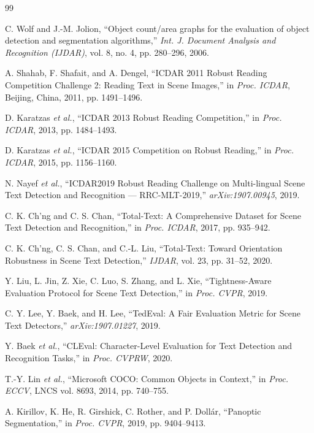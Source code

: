 \documentclass[11pt]{article}
\begin{document}
\begin{thebibliography}{99}

 C. Wolf and J.-M. Jolion, ``Object count/area graphs for the evaluation of object detection and segmentation algorithms,'' \emph{Int. J. Document Analysis and Recognition (IJDAR)}, vol. 8, no. 4, pp. 280--296, 2006.

 A. Shahab, F. Shafait, and A. Dengel, ``ICDAR 2011 Robust Reading Competition Challenge 2: Reading Text in Scene Images,'' in \emph{Proc. ICDAR}, Beijing, China, 2011, pp. 1491--1496.

 D. Karatzas \emph{et al.}, ``ICDAR 2013 Robust Reading Competition,'' in \emph{Proc. ICDAR}, 2013, pp. 1484--1493.

 D. Karatzas \emph{et al.}, ``ICDAR 2015 Competition on Robust Reading,'' in \emph{Proc. ICDAR}, 2015, pp. 1156--1160.

 N. Nayef \emph{et al.}, ``ICDAR2019 Robust Reading Challenge on Multi-lingual Scene Text Detection and Recognition --- RRC-MLT-2019,'' \emph{arXiv:1907.00945}, 2019.

 C. K. Ch'ng and C. S. Chan, ``Total-Text: A Comprehensive Dataset for Scene Text Detection and Recognition,'' in \emph{Proc. ICDAR}, 2017, pp. 935--942.

 C. K. Ch'ng, C. S. Chan, and C.-L. Liu, ``Total-Text: Toward Orientation Robustness in Scene Text Detection,'' \emph{IJDAR}, vol. 23, pp. 31--52, 2020.

 Y. Liu, L. Jin, Z. Xie, C. Luo, S. Zhang, and L. Xie, ``Tightness-Aware Evaluation Protocol for Scene Text Detection,'' in \emph{Proc. CVPR}, 2019.

 C. Y. Lee, Y. Baek, and H. Lee, ``TedEval: A Fair Evaluation Metric for Scene Text Detectors,'' \emph{arXiv:1907.01227}, 2019.

 Y. Baek \emph{et al.}, ``CLEval: Character-Level Evaluation for Text Detection and Recognition Tasks,'' in \emph{Proc. CVPRW}, 2020.

 T.-Y. Lin \emph{et al.}, ``Microsoft COCO: Common Objects in Context,'' in \emph{Proc. ECCV}, LNCS vol. 8693, 2014, pp. 740--755.

 A. Kirillov, K. He, R. Girshick, C. Rother, and P. Doll\'ar, ``Panoptic Segmentation,'' in \emph{Proc. CVPR}, 2019, pp. 9404--9413.


\end{thebibliography}
\end{document}
